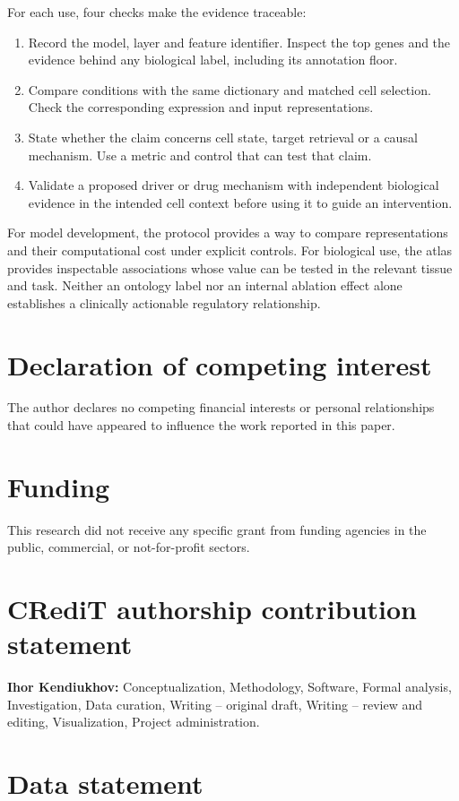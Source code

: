 \documentclass[review,authoryear,12pt]{elsarticle}
\begin{document}
For each use, four checks make the evidence traceable:
\begin{enumerate}
\item Record the model, layer and feature identifier. Inspect the top genes and the evidence behind
any biological label, including its annotation floor.
\item Compare conditions with the same dictionary and matched cell selection. Check the corresponding
expression and input representations.
\item State whether the claim concerns cell state, target retrieval or a causal mechanism. Use a
metric and control that can test that claim.
\item Validate a proposed driver or drug mechanism with independent biological evidence in the
intended cell context before using it to guide an intervention.
\end{enumerate}

For model development, the protocol provides a way to compare representations and their computational
cost under explicit controls. For biological use, the atlas provides inspectable associations whose
value can be tested in the relevant tissue and task. Neither an ontology label nor an internal
ablation effect alone establishes a clinically actionable regulatory relationship.

\section*{Declaration of competing interest}
The author declares no competing financial interests or personal relationships that could have
appeared to influence the work reported in this paper.

\section*{Funding}
This research did not receive any specific grant from funding agencies in the public, commercial, or
not-for-profit sectors.

\section*{CRediT authorship contribution statement}
\textbf{Ihor Kendiukhov:} Conceptualization, Methodology, Software, Formal analysis, Investigation,
Data curation, Writing -- original draft, Writing -- review and editing, Visualization, Project
administration.

\section*{Data statement}
\end{document}
